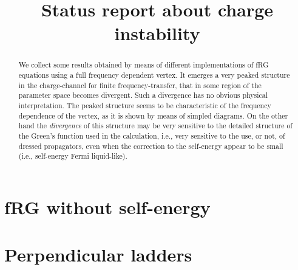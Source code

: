\documentclass[a4paper,11pt]{article}
\begin{document}
\title{Status report about charge instability}

\maketitle 







\begin{abstract}

We collect some results obtained by means of different implementations of fRG equations using a full frequency dependent vertex. 
It emerges a very peaked structure in the charge-channel for finite frequency-transfer, that in some region of the parameter space becomes divergent. Such a divergence has no obvious physical interpretation.  
The peaked structure seems to be characteristic of the frequency dependence of the vertex, as it is shown by means of simpled diagrams. 
On the other hand the \emph{divergence} of this structure may be very sensitive to the detailed structure of the Green's function used in the calculation, i.e., very sensitive to the use, or not, of dressed propagators, even when the correction to the self-energy appear to be small (i.e., self-energy Fermi liquid-like).  

\end{abstract}

\maketitle

\section{fRG without self-energy} 				
\label{sec:frgnoself}
  



\section{Perpendicular ladders}				
\label{sec:perpendciular}



  
\end{document}
